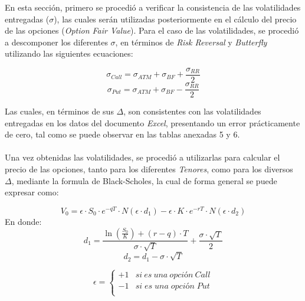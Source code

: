 En esta sección, primero se procedió a verificar la consistencia de las volatilidades entregadas ($\sigma$), las cuales serán utilizadas posteriormente en el cálculo del precio de las opciones (\textit{Option Fair Value}). Para el caso de las volatilidades, se procedió a descomponer los diferentes $\sigma$, en términos de \textit{Risk Reversal} y \textit{Butterfly} utilizando las siguientes ecuaciones:

\begin{equation}
    \sigma_{Call}= \sigma_{ATM}+\sigma_{BF}+\frac{\sigma_{RR}}{2}
\end{equation}
\begin{equation}
    \sigma_{Put}= \sigma_{ATM}+\sigma_{BF}-\frac{\sigma_{RR}}{2}
\end{equation}

\noindent Las cuales, en términos de sus $\Delta$, son consistentes con las volatilidades entregadas en los datos del documento \textit{Excel}, presentando un error prácticamente de cero, tal como se puede observar en las tablas anexadas 5 y 6. \\\\
\noindent Una vez obtenidas las volatilidades, se procedió a utilizarlas para calcular el precio de las opciones, tanto para los diferentes \textit{Tenores}, como para los diversos $\Delta$, mediante la formula de Black-Scholes, la cual de forma general se puede expresar como:

\begin{equation}
    V_0= \epsilon \cdot S_0 \cdot e^{-qT} \cdot N(\epsilon \cdot d_1) - \epsilon \cdot K \cdot e^{-rT} \cdot N(\epsilon \cdot d_2)
\end{equation}
\noindent En donde:
\begin{equation*}
    d_1= \frac{\ln(\frac{S_0}{K})+(r-q)\cdot T}{\sigma \cdot \sqrt{T}}+ \frac{\sigma \cdot \sqrt{T}}{2}
\end{equation*}
\begin{equation*}
    d_2=d_1-\sigma \cdot \sqrt{T}
\end{equation*}

     \begin{equation*}
     \label{eq:aqui-le-mostramos-como-hacerle-la-llave-grande}
     \epsilon = \left\{
	       \begin{array}{ll}
		 +1      &  si\ es\ una\ opción\ Call\\
		 -1 &  si\;es\;una\;opción\;Put\\
		 
	       \end{array}
	     \right.
   \end{equation*}
   
